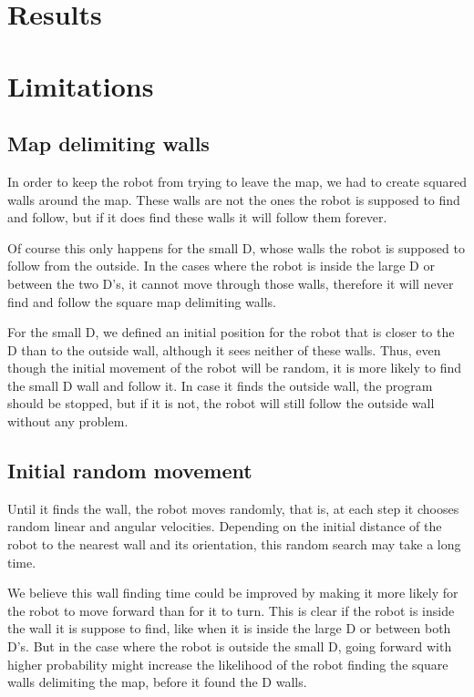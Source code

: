 \documentclass[12pt,a4paper,reqno]{article}
\numberwithin{figure}{section}
\numberwithin{equation}{section}
\begin{document}
\section{Results}

\section{Limitations}

\subsection{Map delimiting walls}

In order to keep the robot from trying to leave the map, we had to create squared walls around the map. These walls are not the ones the robot is supposed to find and follow, but if it does find these walls it will follow them forever.

Of course this only happens for the small D, whose walls the robot is supposed to follow from the outside. In the cases where the robot is inside the large D or between the two D's, it cannot move through those walls, therefore it will never find and follow the square map delimiting walls.

For the small D, we defined an initial position for the robot that is closer to the D than to the outside wall, although it sees neither of these walls. Thus, even though the initial movement of the robot will be random, it is more likely to find the small D wall and follow it. In case it finds the outside wall, the program should be stopped, but if it is not, the robot will still follow the outside wall without any problem.

\subsection{Initial random movement}

Until it finds the wall, the robot moves randomly, that is, at each step it chooses random linear and angular velocities. Depending on the initial distance of the robot to the nearest wall and its orientation, this random search may take a long time. 

We believe this wall finding time could be improved by making it more likely for the robot to move forward than for it to turn. This is clear if the robot is inside the wall it is suppose to find, like when it is inside the large D or between both D's. But in the case where the robot is outside the small D, going forward with higher probability might increase the likelihood of the robot finding the square walls delimiting the map, before it found the D walls.
\end{document}
